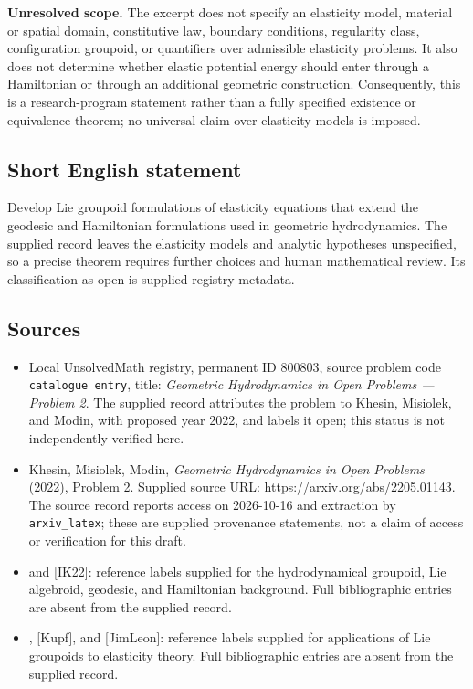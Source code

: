 \documentclass[11pt]{article}
\begin{document}
\textbf{Unresolved scope.} The excerpt does not specify an elasticity model, material or spatial domain, constitutive law, boundary conditions, regularity class, configuration groupoid, or quantifiers over admissible elasticity problems. It also does not determine whether elastic potential energy should enter through a Hamiltonian or through an additional geometric construction. Consequently, this is a research-program statement rather than a fully specified existence or equivalence theorem; no universal claim over elasticity models is imposed.
\subsection{Short English statement}
Develop Lie groupoid formulations of elasticity equations that extend the geodesic and Hamiltonian formulations used in geometric hydrodynamics. The supplied record leaves the elasticity models and analytic hypotheses unspecified, so a precise theorem requires further choices and human mathematical review. Its classification as open is supplied registry metadata.
\subsection{Sources}
\begin{itemize}
\item Local UnsolvedMath registry, permanent ID \(800803\), source problem code \texttt{catalogue entry}, title: \emph{Geometric Hydrodynamics in Open Problems --- Problem 2}. The supplied record attributes the problem to Khesin, Misiolek, and Modin, with proposed year 2022, and labels it open; this status is not independently verified here.
\item Khesin, Misiolek, Modin, \emph{Geometric Hydrodynamics in Open Problems} (2022), Problem 2. Supplied source URL: \url{https://arxiv.org/abs/2205.01143}. The source record reports access on 2026-10-16 and extraction by \texttt{arxiv\_latex}; these are supplied provenance statements, not a claim of access or verification for this draft.
\item [IK18] and [IK22]: reference labels supplied for the hydrodynamical groupoid, Lie algebroid, geodesic, and Hamiltonian background. Full bibliographic entries are absent from the supplied record.
\item [mar-hugh], [Kupf], and [JimLeon]: reference labels supplied for applications of Lie groupoids to elasticity theory. Full bibliographic entries are absent from the supplied record.
\end{itemize}
\end{document}
